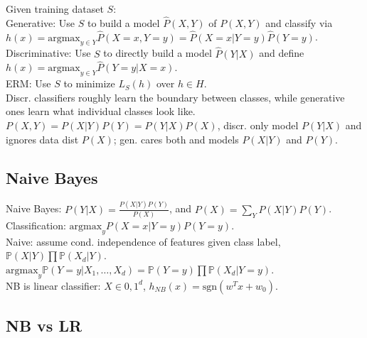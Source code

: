 Given training dataset $S$:\\
Generative: Use $S$ to build a model $\hat{P}(X,Y)$ of $P(X,Y)$ and classify via $h(x) = \text{argmax}_{y \in Y} \hat{P}(X=x, Y=y) = \hat{P}(X=x|Y=y) \hat{P}(Y=y)$.\\
Discriminative: Use $S$ to directly build a model $\hat{P}(Y|X)$ and define $h(x) = \text{argmax}_{y\in Y} \hat{P}(Y=y|X=x)$.\\
ERM: Use $S$ to minimize $L_S(h)$ over $h \in H$.\\
Discr. classifiers roughly learn the boundary between classes, while generative ones learn what individual classes look like.\\
$P(X,Y)=P(X|Y)P(Y) = P(Y|X)P(X)$, discr. only model $P(Y|X)$ and ignores data dist $P(X)$; gen. cares both and models $P(X|Y)$ and $P(Y)$.

\subsection*{Naive Bayes}

Naive Bayes: $P(Y|X)=\frac{P(X|Y)P(Y)}{P(X)}$, and $P(X) = \sum_Y P(X|Y)P(Y)$.\\
Classification: $\text{argmax}_y P(X=x|Y=y)P(Y=y)$.\\
Naive: assume cond. independence of features given class label, $\mathbb{P}(X|Y) \prod \mathbb{P}(X_d|Y)$.\\
$\text{argmax}_y \mathbb{P}(Y=y|X_1, \dots, X_d) = \mathbb{P}(Y=y) \prod \mathbb{P}(X_d|Y=y)$.\\
NB is linear classifier: $X \in {0, 1}^d$, $h_{NB}(x) = \text{sgn}(w^T x + w_0)$.

\subsection*{NB vs LR}

